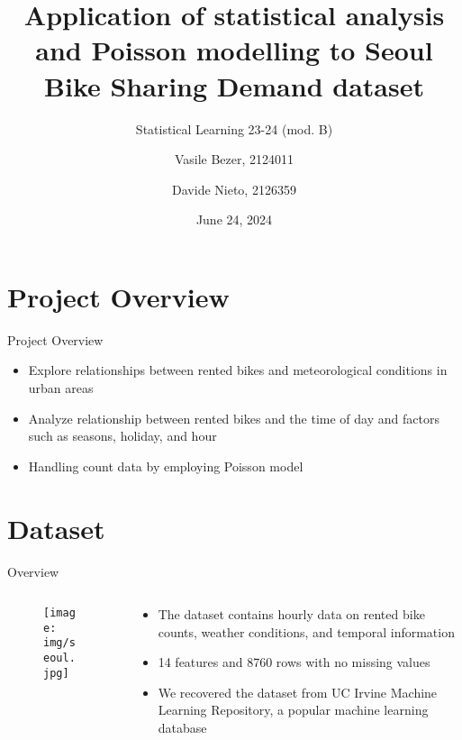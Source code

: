 \documentclass{minesbeamer}
\title{Application of statistical analysis and Poisson modelling to Seoul Bike Sharing Demand dataset}
\subtitle{Statistical Learning 23-24 (mod. B)}
\author[Vasile Bezer]{Vasile Bezer, 2124011 \and Davide Nieto, 2126359}
\date{June 24, 2024} %
\institute[University of Padova]{Department of Mathematics}
\begin{document}
\maketitle

\cutoc

\section{Project Overview}

\begin{frame}{Project Overview}
    \begin{itemize}
        \item Explore relationships between rented bikes and meteorological conditions in urban areas
        \item Analyze relationship between rented bikes and the time of day and factors such as seasons, holiday, and hour
        \item Handling count data by employing Poisson model
    \end{itemize}
\end{frame}

\section{Dataset}

\begin{frame}{Overview}
    \begin{columns}
        \begin{column}{0.6\textwidth}
            \begin{figure}
                \centering
                \texttt{[image: img/seoul.jpg]}
            \end{figure}
        \end{column}
        \begin{column}{0.4\textwidth}
            \begin{itemize}
                \item The dataset contains hourly data on rented bike counts, weather conditions, and temporal information
                \item 14 features and 8760 rows with no missing values
                \item We recovered the dataset from UC Irvine Machine Learning Repository, a popular machine learning database
            \end{itemize}
        \end{column}
    \end{columns}
\end{frame}
\end{document}
